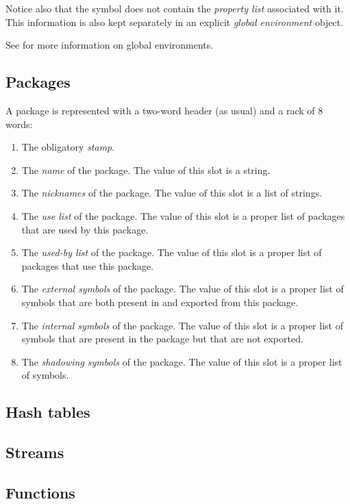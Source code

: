 Notice also that the symbol does not contain the \emph{property list}
associated with it.  This information is also kept separately in an
explicit \emph{global environment} object.

See  for more information on
global environments.

\subsection{Packages}

A package is represented with a two-word header (as usual) and a
rack of 8 words:

\begin{enumerate}
\item The obligatory \emph{stamp}.
\item The \emph{name} of the package.  The value of this slot is a
  string.
\item The \emph{nicknames} of the package.  The value of this slot is
  a list of strings.
\item The \emph{use list} of the package.  The value of this slot is a
  proper list of packages that are used by this package.
\item The \emph{used-by list} of the package.  The value of this slot
is a proper list of packages that use this package.
\item The \emph{external symbols} of the package.  The value of this
  slot is a proper list of symbols that are both present in and
  exported from this package.
\item The \emph{internal symbols} of the package.  The value of this
  slot is a proper list of symbols that are present in the package but
  that are not exported.
\item The \emph{shadowing symbols} of the package.  The value of this
  slot is a proper list of symbols.
\end{enumerate}

\subsection{Hash tables}

\subsection{Streams}

\subsection{Functions}
\label{sec-data-representation-functions}

